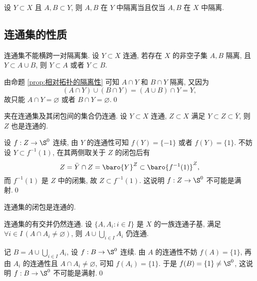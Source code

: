     \begin{Proposition}[相对拓扑的隔离性]\label{prop:相对拓扑的隔离性}
        设 $ Y\subset X $ 且 $ A, B\subset Y $, 则 $ A, B $ 在 $ Y $ 中隔离当且仅当 $ A, B $ 在 $ X $ 中隔离.
    \end{Proposition}

\subsection{连通集的性质}

    \begin{Proposition}
        连通集不能横跨一对隔离集. 设 $ Y\subset X $ 连通, 若存在 $ X $ 的非空子集 $ A, B $ 隔离, 且 $ Y\subset A\cup B $, 则 $ Y\subset A $ 或者 $ Y\subset B $.
    \end{Proposition}
    \begin{Proof}
        由命题 \ref{prop:相对拓扑的隔离性} 可知 $ A\cap Y $ 和 $ B\cap Y $ 隔离, 又因为
        \[
            (A\cap Y)\cup(B\cap Y)=(A\cup B)\cap Y=Y,
        \]
        故只能 $ A\cap Y=\varnothing $ 或者 $ B\cap Y=\varnothing $.\qed
    \end{Proof}

    \begin{Proposition}
        夹在连通集及其闭包间的集合仍连通. 设 $ Y\subset X $ 连通, $ Z\subset X $ 满足 $ Y\subset Z\subset \bar{Y} $, 则 $ Z $ 也是连通的.
    \end{Proposition}
    \begin{Proof}
        设 $ f : Z\to\S^0 $ 连续, 由 $ Y $ 的连通性可知 $ f(Y)=\{-1\} $ 或者 $ f(Y)=\{1\} $. 不妨设 $ Y\subset f^{-1}(1) $, 在其两侧取关于 $ Z $ 的闭包后有
        \[
            Z=\bar{Y}\cap Z=\baro{Y}^Z\subset\baro{f^{-1}(1)}^Z,
        \]
        而 $ f^{-1}(1) $ 是 $ Z $ 中的闭集, 故 $ Z\subset f^{-1}(1) $. 这说明 $ f : Z\to\S^0 $ 不可能是满射.\qed
    \end{Proof}

    \begin{Corollary}
        连通集的闭包是连通的.
    \end{Corollary}

    \begin{Proposition}
        连通集的有交并仍然连通. 设 $ \{A, A_i : i\in I\} $ 是 $ X $ 的一族连通子基, 满足 $ \forall i\in I\,(A\cap A_i\ne\varnothing) $, 则 $ A\cup\bigcup_{i\in I}A_i $ 仍连通.
    \end{Proposition}
    \begin{Proof}
        记 $ B=A\cup\bigcup_{i\in I}A_i $, 设 $ f : B\to\S^0 $ 连续. 由 $ A $ 的连通性不妨 $ f(A)=\{1\} $, 再由 $ A_i $ 的连通性且 $ A\cap A_i\ne\varnothing $, 可知 $ f(A_i)=\{1\} $. 于是 $ f(B)=\{1\}\ne\S^0 $, 这说明 $ f : B\to\S^0 $ 不可能是满射.\qed
    \end{Proof}

